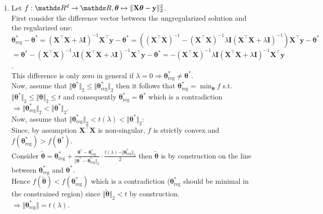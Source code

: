 \documentclass[a4paper]{article}
\begin{document}
{\begin{enumerate}
$ -\log p(\theta) = 0.5\cdot\lambda\vert \theta \vert + c$ with $c\in\R \iff p(\theta) \propto \exp(-0.5 \cdot \lambda \vert \theta \vert).$ \\
$\Rightarrow \theta \overset{\text{i.i.d.}}{\sim} \textrm{Laplace}(0, 2/\lambda).$
\item Let $f:\R^d\rightarrow\R, \bm{\theta} \mapsto \Vert\mathbf{X}\bm{\theta} - \mathbf{y}\Vert^2_2$. \\
First consider the difference vector between the ungregularized solution and the regularized one: \\
$\bm{\theta}^*_{\text{reg}} - \bm{\theta}^* = (\mathbf{X}^\top\mathbf{X} + \lambda\mathbf{I})^{-1}\mathbf{X}^\top\mathbf{y} -  \bm{\theta}^* = ( (\mathbf{X}^\top\mathbf{X})^{-1} -  (\mathbf{X}^\top\mathbf{X})^{-1}\lambda\mathbf{I}(\mathbf{X}^\top\mathbf{X} + \lambda\mathbf{I})^{-1}) \mathbf{X}^\top\mathbf{y} -  \bm{\theta}^*$ \\
$ = \bm{\theta}^* - (\mathbf{X}^\top\mathbf{X})^{-1}\lambda\mathbf{I}(\mathbf{X}^\top\mathbf{X} + \lambda\mathbf{I})^{-1} \mathbf{X}^\top\mathbf{y} -  \bm{\theta}^* =  - (\mathbf{X}^\top\mathbf{X})^{-1}\lambda\mathbf{I}(\mathbf{X}^\top\mathbf{X} + \lambda\mathbf{I})^{-1} \mathbf{X}^\top\mathbf{y}$. \\
This difference is only zero in general if $\lambda = 0 \Rightarrow \bm{\theta}^*_{\text{reg}} \neq \bm{\theta}^*.$ \\
Now, assume that $ \Vert\bm{\theta}^*\Vert_2 \leq  \Vert\bm{\theta}_{\text{reg}}^*\Vert_2$ then it follows that $ \bm{\theta}_{\text{reg}}^* = \min_{\bm{\theta}} f$ s.t. $\Vert\bm{\theta}^*\Vert_2 \leq \Vert \bm{\theta} \Vert_2\leq t$ and consequently $\bm{\theta}^*_{\text{reg}} = \bm{\theta}^*$ which is a contradiction $\Rightarrow  \Vert\bm{\theta}_{\text{reg}}^*\Vert_2 < \Vert\bm{\theta}^*\Vert_2$. \\
Now, assume that $\Vert\bm{\theta}_{\text{reg}}^*\Vert_2 < t(\lambda) < \Vert\bm{\theta}^*\Vert_2$: \\
Since, by assumption $\mathbf{X}^\top\mathbf{X}$ is non-singular, $f$ is strictly convex and $f(\bm{\theta}_{\text{reg}}^*) > f(\bm{\theta}^*)$. \\
Consider $\tilde{\bm{\theta}} = \bm{\theta}_{\text{reg}}^* + \frac{\bm{\theta}^* - \bm{\theta}_{\text{reg}}^*}{\Vert\bm{\theta}^* - \bm{\theta}_{\text{reg}}^*\Vert_2}\cdot \frac{t(\lambda) - \Vert\bm{\theta}_{\text{reg}}^*\Vert_2}{2}$ then $\tilde{\bm{\theta}}$ is by construction on the line between $\bm{\theta}_{\text{reg}}^*$ and $\bm{\theta}^*$. \\
Hence $f(\tilde{\bm{\theta}}) < f(\bm{\theta}_{\text{reg}}^*)$ which is a contradiction ($\bm{\theta}_{\text{reg}}^*$ should be minimal in the constrained region) since $\Vert\tilde{\bm{\theta}}\Vert_2 < t$ by construction. \\
$\Rightarrow \Vert \bm{\theta}_{\text{reg}}^* \Vert = t(\lambda).$

\end{enumerate}
}
\end{document}
